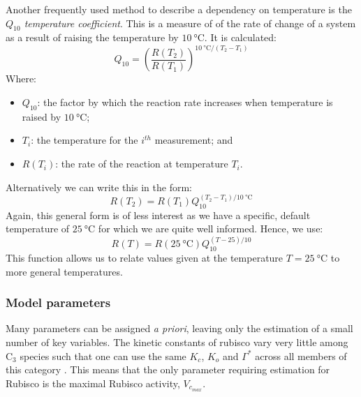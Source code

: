 \documentclass[11pt]{article} %
\begin{document}
Another frequently used method to describe a dependency on temperature is the \emph{$Q_{10}$ temperature coefficient}. This is a measure of of the rate of  change of a system as a result of raising the temperature by $\SI{10}{\celsius}$. It is calculated:
\begin{equation} \label{Q10_gen}
Q_{10} = \left ( \frac{R(T_2)}{R(T_1)} \right )^{\SI{10}{\celsius}/(T_2 - T_1)}
\end{equation}
Where:
\begin{itemize}
 \item $Q_{10}$: the factor by which the reaction rate increases when temperature is raised by $\SI{10}{\celsius}$;
 \item $T_i$: the temperature for the $i^{th}$ measurement; and
 \item $R(T_i)$: the rate of the reaction at temperature $T_i$.
\end{itemize}
Alternatively we can write this in the form:
\begin{equation}
R(T_2) = R(T_1) Q_{10}^{(T_2 - T_1)/\SI{10}{\celsius}}
\end{equation}
Again, this general form is of less interest as we have a specific, default temperature of $\SI{25}{\celsius}$ for which we are quite well informed. Hence, we use:
\begin{equation} \label{Q10}
R(T) = R(\SI{25}{\celsius})Q_{10}^{(T-25)/10}
\end{equation}
This function allows us to relate values given at the temperature $T = \SI{25}{\celsius}$ to more general temperatures.

\subsubsection{Model parameters}
Many parameters can be assigned \emph{a priori}, leaving only the estimation of a small number of key variables. The kinetic constants of rubisco vary very little among C$_3$ species such that one can use the same $K_c$, $K_o$ and $\Gamma^*$ across all members of this category \cite{CaemmererBiochemicalmodelsleaf2000}. This means that the only parameter requiring estimation for Rubisco is the maximal Rubisco activity, $V_{c_{max}}$. 
\end{document}
